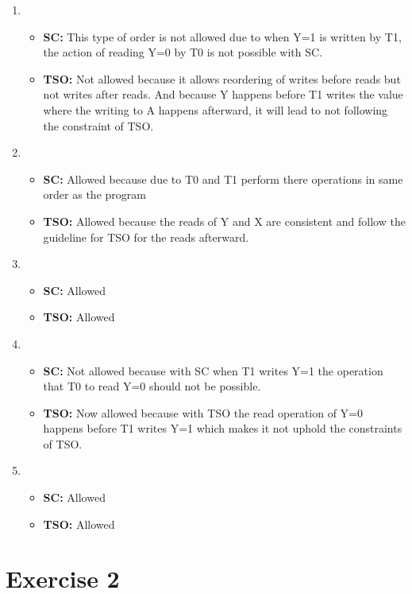 \documentclass{article}
\begin{document}
\begin{enumerate}
    \item  \begin{itemize}
        \item \textbf{SC:} This type of order is not allowed due to when Y=1 is written by T1, the action of reading Y=0 by T0 is not possible with SC.
        \item \textbf{TSO:} Not allowed because it allows reordering of writes before reads but not writes after reads. And because Y happens before T1 writes the value where the writing to A happens afterward, it will lead to not following the constraint of TSO.
    \end{itemize}
    \item  \begin{itemize}
        \item \textbf{SC:} Allowed because due to T0 and T1 perform there operations in same order as the program
        \item \textbf{TSO:} Allowed because the reads of Y and X are consistent and follow the guideline for TSO for the reads afterward.
    \end{itemize}
    \item  \begin{itemize}
        \item \textbf{SC:} Allowed
        \item \textbf{TSO:} Allowed
    \end{itemize}
    \item  \begin{itemize}
        \item \textbf{SC:} Not allowed because with SC when T1 writes Y=1 the operation that T0 to read Y=0 should not be possible.
        \item \textbf{TSO:} Now allowed because with TSO the read operation of Y=0 happens before T1 writes Y=1 which makes it not uphold the constraints of TSO.
    \end{itemize}
    \item  \begin{itemize}
        \item \textbf{SC:} Allowed
        \item \textbf{TSO:} Allowed
    \end{itemize}
\end{enumerate}



\section*{Exercise 2}
\end{document}
